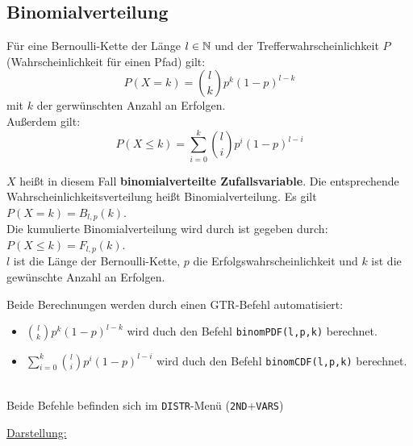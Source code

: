 \documentclass[../MAIN/main.tex]{subfiles}
\begin{document}
\subsection{Binomialverteilung}
\begin{Theorem}
  Für eine Bernoulli-Kette der Länge $l \in \mathbb{N}$ und der Trefferwahrscheinlichkeit $P$ (Wahrscheinlichkeit für einen Pfad) gilt:
  $$P(X=k) = {l \choose k} p^k (1-p) ^{l-k}$$
  mit $k$ der gerwünschten Anzahl an Erfolgen.\\
  Außerdem gilt:
  $$P(X\leq k) = \sum_{i=0}^{k}{l \choose i} p^i (1-p) ^{l-i}$$
\end{Theorem}
\begin{Bemerkung}
  \begin{Definition}
    $X$ heißt in diesem Fall \textbf{binomialverteilte Zufallsvariable}. Die entsprechende Wahrscheinlichkeitsverteilung heißt Binomialverteilung. Es gilt $P(X=k) =  B_{l,p}(k)$.\\
    Die kumulierte Binomialverteilung wird durch ist gegeben durch: $P(X \leq k) = F_{l,p}(k)$.\\
     $l$ ist die Länge der Bernoulli-Kette, $p$ die Erfolgswahrscheinlichkeit und $k$ ist die gewünschte Anzahl an Erfolgen.

  \end{Definition}
\end{Bemerkung}
\begin{GTR-Tipp}
  Beide Berechnungen werden durch einen GTR-Befehl automatisiert:\\
  \begin{itemize}
    \item $\displaystyle{{l \choose k}} p^k (1-p) ^{l-k}$ wird duch den Befehl \texttt{binomPDF(l,p,k)} berechnet.
    \item $\displaystyle{\sum_{i=0}^{k}{l \choose i}} p^i (1-p) ^{l-i}$ wird duch den Befehl \texttt{binomCDF(l,p,k)} berechnet.
  \end{itemize}\\
  Beide Befehle befinden sich im \texttt{DISTR}-Menü (\texttt{2ND}+\texttt{VARS})
\end{GTR-Tipp}
\underline{Darstellung:}\\
\begin{minipage}{0.5\textwidth}
\end{minipage}
\end{document}
